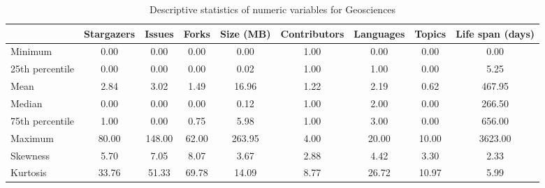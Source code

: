 \begin{table}
\centering
\caption{Descriptive statistics of numeric variables for Geosciences}
\label{tab:Geosciences}
\begin{tabular}{lcccccccc}
\toprule
{} &  Stargazers &  Issues &  Forks &  Size (MB) &  Contributors &  Languages &  Topics &  Life span (days) \\
\midrule
Minimum         &        0.00 &    0.00 &   0.00 &       0.00 &          1.00 &       0.00 &    0.00 &              0.00 \\
25th percentile &        0.00 &    0.00 &   0.00 &       0.02 &          1.00 &       1.00 &    0.00 &              5.25 \\
Mean            &        2.84 &    3.02 &   1.49 &      16.96 &          1.22 &       2.19 &    0.62 &            467.95 \\
Median          &        0.00 &    0.00 &   0.00 &       0.12 &          1.00 &       2.00 &    0.00 &            266.50 \\
75th percentile &        1.00 &    0.00 &   0.75 &       5.98 &          1.00 &       3.00 &    0.00 &            656.00 \\
Maximum         &       80.00 &  148.00 &  62.00 &     263.95 &          4.00 &      20.00 &   10.00 &           3623.00 \\
Skewness        &        5.70 &    7.05 &   8.07 &       3.67 &          2.88 &       4.42 &    3.30 &              2.33 \\
Kurtosis        &       33.76 &   51.33 &  69.78 &      14.09 &          8.77 &      26.72 &   10.97 &              5.99 \\
\bottomrule
\end{tabular}
\end{table}
